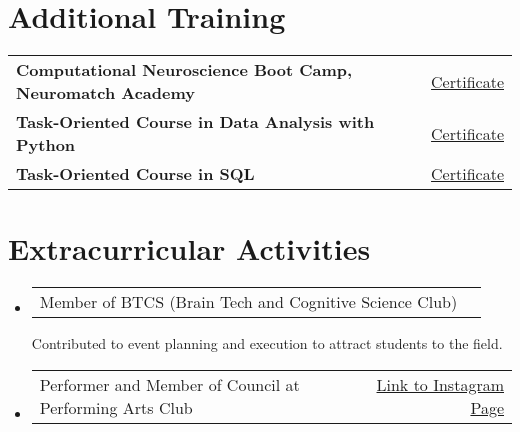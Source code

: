 \documentclass[a4paper,10pt]{article}
\begin{document}
\section{Additional Training}

\begin{tabularx}{\linewidth}{ @{}l X r@{} }
    \textbf{Computational Neuroscience Boot Camp, Neuromatch Academy} & & \hfill \href{https://portal.neuromatchacademy.org/certificate/ee23deef-9e73-4233-8c46-6e85375d9f1b}{Certificate} \\[3.75pt]
    \textbf{Task-Oriented Course in Data Analysis with Python} & & \hfill \href{https://quera.org/certificate/7p1aeaOn/}{Certificate} \\[3.75pt]
    \textbf{Task-Oriented Course in SQL} & & \hfill \href{https://quera.org/certificate/D4uYyhcQ/}{Certificate} \\
\end{tabularx}

\section{Extracurricular Activities}

\begin{itemize}
    \item 
    \begin{tabularx}{\linewidth}{@{}X r@{}}
        {Member of BTCS (Brain Tech and Cognitive Science Club)}\\
    \end{tabularx}
    Contributed to event planning and execution to attract students to the field.
    \item 
    \begin{tabularx}{\linewidth}{@{}X r@{}}
        {Performer and Member of Council at Performing Arts Club} & \hfill \href{https://www.instagram.com/fanni_theater/}{Link to Instagram Page} \\[3.75pt]
    \end{tabularx}
\end{itemize}
\end{document}
